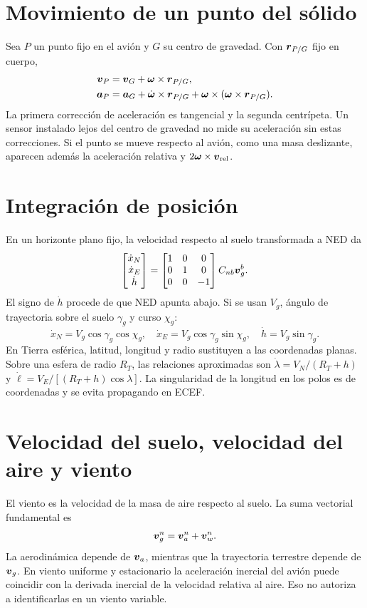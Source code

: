 \section{Movimiento de un punto del sólido}
Sea $P$ un punto fijo en el avión y $G$ su centro de gravedad. Con $\boldsymbol{r}_{P/G}$ fijo en cuerpo,
\begin{align}
\boldsymbol{v}_P&=\boldsymbol{v}_G+\boldsymbol{\omega}\times\boldsymbol{r}_{P/G},\\
\boldsymbol{a}_P&=\boldsymbol{a}_G+\dot{\boldsymbol{\omega}}\times\boldsymbol{r}_{P/G}
+\boldsymbol{\omega}\times(\boldsymbol{\omega}\times\boldsymbol{r}_{P/G}).
\end{align}
La primera corrección de aceleración es tangencial y la segunda centrípeta. Un sensor instalado lejos del centro de gravedad no mide su aceleración sin estas correcciones. Si el punto se mueve respecto al avión, como una masa deslizante, aparecen además la aceleración relativa y $2\boldsymbol{\omega}\times\boldsymbol{v}_{\rm rel}$.

\section{Integración de posición}
En un horizonte plano fijo, la velocidad respecto al suelo transformada a NED da
\begin{equation}
\begin{bmatrix}\dot x_N\\\dot x_E\\\dot h\end{bmatrix}=
\begin{bmatrix}1&0&0\\0&1&0\\0&0&-1\end{bmatrix}
C_{nb}\boldsymbol{v}_g^b.
\label{eq:posicion-local}
\end{equation}
El signo de $\dot h$ procede de que NED apunta abajo. Si se usan $V_g$, ángulo de trayectoria sobre el suelo $\gamma_g$ y curso $\chi_g$:
\begin{equation}
\dot x_N=V_g\cos\gamma_g\cos\chi_g,\quad
\dot x_E=V_g\cos\gamma_g\sin\chi_g,\quad
\dot h=V_g\sin\gamma_g.
\end{equation}
En Tierra esférica, latitud, longitud y radio sustituyen a las coordenadas planas. Sobre una esfera de radio $R_T$, las relaciones aproximadas son $\dot\lambda=V_N/(R_T+h)$ y $\dot\ell=V_E/[(R_T+h)\cos\lambda]$. La singularidad de la longitud en los polos es de coordenadas y se evita propagando en ECEF.

\section{Velocidad del suelo, velocidad del aire y viento}
El viento es la velocidad de la masa de aire respecto al suelo. La suma vectorial fundamental es
\begin{equation}
\boldsymbol{v}_g^n=\boldsymbol{v}_a^n+\boldsymbol{v}_w^n.\label{eq:triangulo-viento}
\end{equation}
La aerodinámica depende de $\boldsymbol{v}_a$, mientras que la trayectoria terrestre depende de $\boldsymbol{v}_g$. En viento uniforme y estacionario la aceleración inercial del avión puede coincidir con la derivada inercial de la velocidad relativa al aire. Eso no autoriza a identificarlas en un viento variable.

